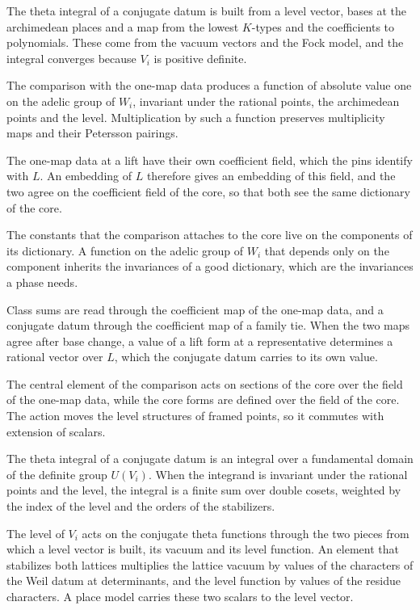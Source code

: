 The theta integral of a conjugate datum is built from a level vector, bases at the archimedean places and
a map from the lowest $K$-types and the coefficients to polynomials. These come from the vacuum vectors
and the Fock model, and the integral converges because $V_i$ is positive definite.

The comparison with the one-map data produces a function of absolute value one on the adelic group of
$W_i$, invariant under the rational points, the archimedean points and the level. Multiplication by such
a function preserves multiplicity maps and their Petersson pairings.

The one-map data at a lift have their own coefficient field, which the pins identify with $L$. An
embedding of $L$ therefore gives an embedding of this field, and the two agree on the coefficient field
of the core, so that both see the same dictionary of the core.

The constants that the comparison attaches to the core live on the components of its dictionary. A
function on the adelic group of $W_i$ that depends only on the component inherits the invariances of a
good dictionary, which are the invariances a phase needs.

Class sums are read through the coefficient map of the one-map data, and a conjugate datum through the
coefficient map of a family tie. When the two maps agree after base change, a value of a lift form at a
representative determines a rational vector over $L$, which the conjugate datum carries to its own
value.

The central element of the comparison acts on sections of the core over the field of the one-map data,
while the core forms are defined over the field of the core. The action moves the level structures of
framed points, so it commutes with extension of scalars.

The theta integral of a conjugate datum is an integral over a fundamental domain of the definite group
$U(V_i)$. When the integrand is invariant under the rational points and the level, the integral is a
finite sum over double cosets, weighted by the index of the level and the orders of the stabilizers.

The level of $V_i$ acts on the conjugate theta functions through the two pieces from which a level
vector is built, its vacuum and its level function. An element that stabilizes both lattices multiplies
the lattice vacuum by values of the characters of the Weil datum at determinants, and the level function
by values of the residue characters. A place model carries these two scalars to the level vector.

